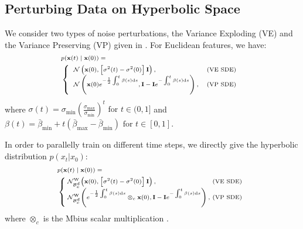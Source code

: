 \documentclass[letterpaper]{article} %
\begin{document}
\subsection{Perturbing Data on Hyperbolic Space}
We consider two types of noise perturbations, the Variance Exploding (VE) and the Variance Preserving (VP) given in \cite{song2020score}. For Euclidean features, we have:
\begin{equation}\label{9}
\begin{scriptsize}{
\begin{aligned}
&p(\mathbf{x}(t) \mid \mathbf{x}(0))=\\ &\left\{\begin{array}{ll}
\mathcal{N}\left(\mathbf{x}(0),\left[\sigma^{2}(t)-\sigma^{2}(0)\right] \mathbf{I}\right), & \text {(VE SDE) } \\
\mathcal{N}\left(\mathbf{x}(0)e^{-\frac{1}{2} \int_{0}^{t} \beta(s) \mathrm{d} s} , \mathbf{I}-\mathbf{I} e^{-\int_{0}^{t} \beta(s) \mathrm{d} s}\right), & (\text{VP SDE)} \\
\end{array}\right.
\end{aligned}
}\end{scriptsize}
\end{equation}
where $\sigma(t)=\sigma_{\min }\left(\frac{\sigma_{\max }}{\sigma_{\min }}\right)^{t} \text { for } t \in(0,1]$ and $\beta(t)=\bar{\beta}_{\min }+t\left(\bar{\beta}_{\max }-\bar{\beta}_{\min }\right) \text { for } t \in[0,1]$.

In order to parallelly train on different time steps, we directly give the hyperbolic distribution $p (x_t | x_0)$:
\begin{equation}\label{10}
\begin{scriptsize}{
\begin{aligned}
&p(\mathbf{x}(t) \mid \mathbf{x}(0))=\\ &\left\{\hspace{-0.1cm}\begin{array}{ll}
\mathcal{N}_{\mathcal{B}_{c}^{d}}^{\mathrm{W}}\!\left(\mathbf{x}(0),\left[\sigma^{2}(t)-\sigma^{2}(0)\right] \mathbf{I}\right), &\hspace{-0.25cm} \text{(VE SDE)} \\
\mathcal{N}_{\mathcal{B}_{c}^{d}}^{\mathrm{W}}\!\left(e^{-\frac{1}{2} \int_{0}^{t} \beta(s) \mathrm{d} s}\otimes_c \mathbf{x}(0) , \mathbf{I}-\mathbf{I} e^{-\int_{0}^{t} \beta(s) \mathrm{d} s}\right), &\hspace{-0.25cm} (\text{VP SDE)} \\
\end{array}\right.
\end{aligned}
}\end{scriptsize}
\end{equation}
where $\otimes_c$ is the Mbius scalar multiplication \cite{ungar2007hyperbolic}.
\end{document}
